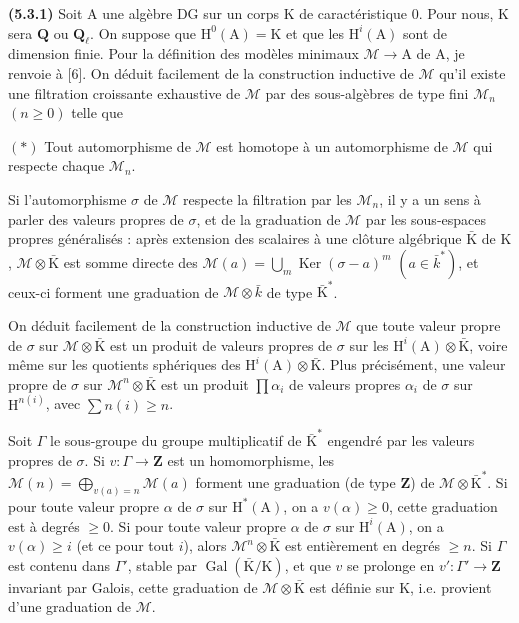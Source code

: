 \documentclass[11pt,leqno]{article}
\begin{document}
\textbf{(5.3.1)} Soit \(\mathrm{A}\) une algèbre DG sur un corps \(\mathrm{K}\) de caractéristique \(0\). Pour nous, \(\mathrm{K}\) sera \(\mathbf{Q}\) ou \(\mathbf{Q}_{\ell}\). On suppose que \(\mathrm{H}^0(\mathrm{A})=\mathrm{K}\) et que les \(\mathrm{H}^i(\mathrm{A})\) sont de dimension finie. Pour la définition des modèles minimaux \(\mathcal{M}\to\mathrm{A}\) de \(\mathrm{A}\), je renvoie à [6]. On déduit facilement de la construction inductive de \(\mathcal{M}\) qu’il existe une filtration croissante exhaustive de \(\mathcal{M}\) par des sous-algèbres de type fini \(\mathcal{M}_n\) \((n\geq0)\) telle que

\((*)\) Tout automorphisme de \(\mathcal{M}\) est homotope à un automorphisme de \(\mathcal{M}\) qui respecte chaque \(\mathcal{M}_n\).

Si l’automorphisme \(\sigma\) de \(\mathcal{M}\) respecte la filtration par les \(\mathcal{M}_n\), il y a un sens à parler des valeurs propres de \(\sigma\), et de la graduation de \(\mathcal{M}\) par les sous-espaces propres généralisés : après extension des scalaires à une clôture algébrique \(\bar{\mathrm{K}}\) de \(\mathrm{K}\), \(\mathcal{M}\otimes\bar{\mathrm{K}}\) est somme directe des \(\mathcal{M}(a)=\bigcup\limits_m\operatorname{Ker}(\sigma-a)^m\) \((a\in\bar{k}^*)\), et ceux-ci forment une graduation de \(\mathcal{M}\otimes\bar{k}\) de type \(\bar{\mathrm{K}}^*\).

On déduit facilement de la construction inductive de \(\mathcal{M}\) que toute valeur propre de \(\sigma\) sur \(\mathcal{M}\otimes\bar{\mathrm{K}}\) est un produit de valeurs propres de \(\sigma\) sur les \(\mathrm{H}^i(\mathrm{A})\otimes\bar{\mathrm{K}}\), voire même sur les quotients sphériques des \(\mathrm{H}^i(\mathrm{A})\otimes\bar{\mathrm{K}}\). Plus précisément, une valeur propre de \(\sigma\) sur \(\mathcal{M}^n\otimes\bar{\mathrm{K}}\) est un produit \(\prod\alpha_i\) de valeurs propres \(\alpha_i\) de \(\sigma\) sur \(\mathrm{H}^{n(i)}\), avec \(\sum n(i)\geq n\).

Soit \(\Gamma\) le sous-groupe du groupe multiplicatif de \(\bar{\mathrm{K}}^*\) engendré par les valeurs propres de \(\sigma\). Si \(v:\Gamma\to\mathbf{Z}\) est un homomorphisme, les \(\mathcal{M}(n)=\bigoplus\limits_{v(a)=n}\mathcal{M}(a)\) forment une graduation (de type \(\mathbf{Z}\)) de \(\mathcal{M}\otimes\bar{\mathrm{K}}^*\). Si pour toute valeur propre \(\alpha\) de \(\sigma\) sur \(\mathrm{H}^*(\mathrm{A})\), on a \(v(\alpha)\geq0\), cette graduation est à degrés \(\geq0\). Si pour toute valeur propre \(\alpha\) de \(\sigma\) sur \(\mathrm{H}^i(\mathrm{A})\), on a \(v(\alpha)\geq i\) (et ce pour tout \(i\)), alors \(\mathcal{M}^n\otimes\bar{\mathrm{K}}\) est entièrement en degrés \(\geq n\). Si \(\Gamma\) est contenu dans \(\Gamma'\), stable par \(\operatorname{Gal}(\bar{\mathrm{K}}/\mathrm{K})\), et que \(v\) se prolonge en \(v':\Gamma'\to\mathbf{Z}\) invariant par Galois, cette graduation de \(\mathcal{M}\otimes\bar{\mathrm{K}}\) est définie sur \(\mathrm{K}\), i.e. provient d’une graduation de \(\mathcal{M}\).
\end{document}
